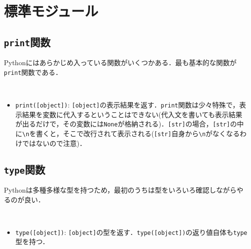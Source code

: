 \section{標準モジュール}

\subsection{\texttt{print}関数}

Pythonにはあらかじめ入っている関数がいくつかある．最も基本的な関数が\texttt{print}関数である．

\begin{gram}　
\begin{itemize}
\item \texttt{print([object])}: \texttt{[object]}の表示結果を返す．\texttt{print}関数は少々特殊で，表示結果を変数に代入するということはできない(代入文を書いても表示結果が出るだけで，その変数には\texttt{None}が格納される)．\texttt{[str]}の場合，\texttt{[str]}の中に\verb|\n|を書くと，そこで改行されて表示される(\texttt{[str]}自身から\verb|\n|がなくなるわけではないので注意)．
\end{itemize}
\end{gram}

\begin{cod}[\texttt{py1.py}]　
}]{code/py1.py}
\vspace{-7pt}
\begin{lstlisting}
~~~Hello world!~~~
---Hello
world!---
\end{lstlisting}
\end{cod}
\vspace{-10pt}

\begin{cod}[\texttt{py2.py}]　
}]{code/py2.py}
\vspace{-7pt}
\begin{lstlisting}
---
10
---
None
\end{lstlisting}
\end{cod}
\vspace{-10pt}

\subsection{\texttt{type}関数}

Pythonは多種多様な型を持つため，最初のうちは型をいろいろ確認しながらやるのが良い．

\begin{gram}　
\begin{itemize}
\item \texttt{type([object])}: \texttt{[object]}の型を返す．\texttt{type([object])}の返り値自体も\texttt{type}型を持つ．
\end{itemize}
\end{gram}

